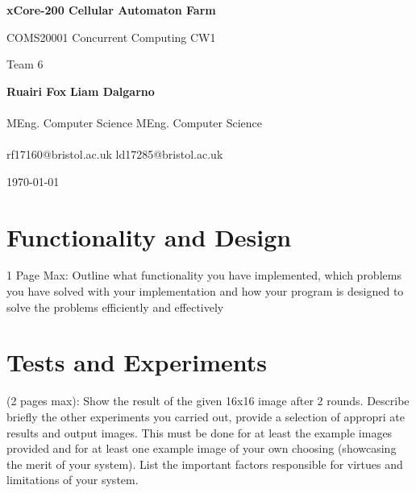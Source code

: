 \documentclass{article}
\begin{document}
    \begin{titlepage}
        \begin{center}
            \vspace*{2cm}

            {\huge \textbf{xCore-200 Cellular Automaton Farm}}

            \vspace{0.5cm}

            {\Large COMS20001 Concurrent Computing CW1}

            \vspace{0.5cm}

            {\large Team 6}

            \vspace{1cm}
            
            \hspace*{1cm} {\Large \textbf{Ruairi Fox}} \hfill {\Large \textbf{Liam Dalgarno}} \hspace*{1cm} \\~\\[-0.5em]
            \hspace*{1cm} MEng. Computer Science \hfill MEng. Computer Science  \hspace*{1cm} \\~\\[-1em]
            \hspace*{1cm} rf17160@bristol.ac.uk  \hfill ld17285@bristol.ac.uk  \hspace*{1cm} 

            \vspace{1cm}

            {\large \today}
        \end{center}
    \end{titlepage}

    \section{Functionality and Design}
    1 Page Max: Outline what functionality you have implemented, which problems you have solved with your implementation and how your program is designed to solve the problems efficiently and effectively
    \pagebreak

    \section{Tests and Experiments}
    (2 pages max): Show the result of the given 16x16 image after 2 rounds. Describe briefly the other experiments you carried out, provide a selection of appropri ate results and output images. This must be done for at least the example images provided and for at least one example image of your own choosing (showcasing the merit of your system). List the important factors responsible for virtues and limitations of your system. 
    \pagebreak
\end{document}
